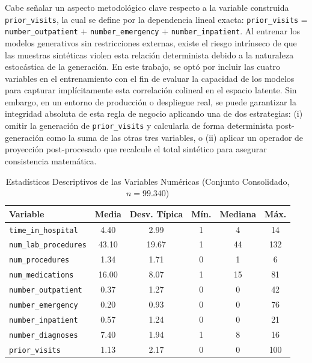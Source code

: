 Cabe señalar un aspecto metodológico clave respecto a la variable construida \texttt{prior\_visits}, la cual se define por la dependencia lineal exacta: \texttt{prior\_visits} = \texttt{number\_outpatient} + \texttt{number\_emergency} + \texttt{number\_inpatient}. Al entrenar los modelos generativos sin restricciones externas, existe el riesgo intrínseco de que las muestras sintéticas violen esta relación determinista debido a la naturaleza estocástica de la generación. En este trabajo, se optó por incluir las cuatro variables en el entrenamiento con el fin de evaluar la capacidad de los modelos para capturar implícitamente esta correlación colineal en el espacio latente. Sin embargo, en un entorno de producción o despliegue real, se puede garantizar la integridad absoluta de esta regla de negocio aplicando una de dos estrategias: (i) omitir la generación de \texttt{prior\_visits} y calcularla de forma determinista post-generación como la suma de las otras tres variables, o (ii) aplicar un operador de proyección post-procesado que recalcule el total sintético para asegurar consistencia matemática.

\begin{table}[htbp]
\centering
\caption{Estadísticos Descriptivos de las Variables Numéricas (Conjunto \mbox{Consolidado}, $n=99.340$)}
\label{tab:eda_numericas}
\begin{tabularx}{\textwidth}{>{\raggedright\arraybackslash}X c c c c c}
\toprule
\textbf{Variable} & \textbf{Media} & \textbf{Desv. Típica} & \textbf{Mín.} & \textbf{Mediana} & \textbf{Máx.} \\
\midrule
\rowcolor{gray!10} \texttt{time\_in\_hospital} & 4.40 & 2.99 & 1 & 4 & 14 \\
\texttt{num\_lab\_procedures} & 43.10 & 19.67 & 1 & 44 & 132 \\
\rowcolor{gray!10} \texttt{num\_procedures} & 1.34 & 1.71 & 0 & 1 & 6 \\
\texttt{num\_medications} & 16.00 & 8.07 & 1 & 15 & 81 \\
\rowcolor{gray!10} \texttt{number\_outpatient} & 0.37 & 1.27 & 0 & 0 & 42 \\
\texttt{number\_emergency} & 0.20 & 0.93 & 0 & 0 & 76 \\
\rowcolor{gray!10} \texttt{number\_inpatient} & 0.57 & 1.24 & 0 & 0 & 21 \\
\texttt{number\_diagnoses} & 7.40 & 1.94 & 1 & 8 & 16 \\
\rowcolor{gray!10} \texttt{prior\_visits} & 1.13 & 2.17 & 0 & 0 & 100 \\
\bottomrule
\end{tabularx}
\end{table}

